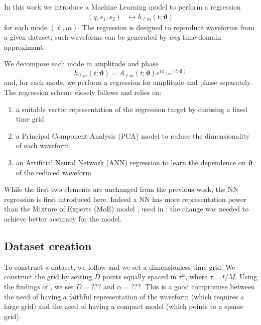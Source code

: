 \documentclass[twocolumn,showpacs,preprintnumbers,nofootinbib,prd,
superscriptaddress,10pt]{revtex4-1}
\begin{document}
In this work we introduce a Machine Learning model to perform a regression
\begin{align}\label{eq:objective}
	(q, s_1, s_2) &\longmapsto h_{\ell m}(t; \boldsymbol{\vartheta})
\end{align}
for each mode $(\ell,m)$.
The regression is designed to reproduce waveforms from a given dataset; such waveforms can be generated by {\it any} time-domain approximant.

We decompose each mode in amplitude and phase
\begin{equation}
	h_{\ell m}(t; \boldsymbol{\vartheta}) = A_{\ell m}(t; \boldsymbol{\vartheta}) e^{i \phi_{\ell m}(t; \boldsymbol{\vartheta})}
\end{equation}
and, for each mode, we perform a regression for amplitude and phase separately. The regression scheme closely follows \cite{Schmidt:2020yuu} and relies on:
\begin{enumerate}[label=(\alph*)]
	\item a suitable vector representation of the regression target by choosing a fixed time grid
	\item a Principal Component Analysis (PCA) model to reduce the dimensionality of each waveform
	\item an Artificial Neural Network (ANN) regression to learn the dependence on $\boldsymbol{\vartheta}$ of the reduced waveform
\end{enumerate}

While the first two elements are unchanged from the previous work, the NN regression is first introduced here. Indeed a NN has more representation power than the Mixture of Experts (MoE) model \cite{Jacobs1991AdaptiveMoE}, used in \cite{Schmidt:2020yuu}: the change was needed to achieve better accuracy for the model.

\subsection{Dataset creation}
\label{sec:dataset}

To construct a dataset, we follow \cite{Schmidt:2020yuu} and we set a dimensionless time grid. We construct the grid by setting $D$ points equally spaced in $\tau^\alpha$, where $\tau = t/M$. Using the findings of \cite{Schmidt:2020yuu}, we set $D = \text{???}$ and $\alpha = \text{???}$.
%
This is a good compromise between the need of having a faithful representation of the waveform (which requires a large grid) and the need of having a compact model (which points to a sparse grid).
\end{document}
